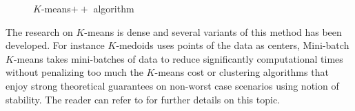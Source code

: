 \begin{figure}[h]
\begin{center}
   \caption{$K$-means$++$ algorithm}
   \label{algo:kmeans++_algo}
\end{center}
\vspace{-15pt}
\end{figure}
The research on $K$-means is dense and several variants of this method has been developed. For instance $K$-medoids \citep{KaufmanR90} uses points of the data as centers, Mini-batch $K$-means\citep{Sculley:2010:WKC:1772690.1772862} takes mini-batches of data to reduce significantly computational times without penalizing too much the $K$-means cost or clustering algorithms that enjoy strong theoretical guarantees on non-worst case scenarios using notion of stability\citep{Ostrovsky2006}. The reader can refer to \citep{hennig2015handbook} for further details on this topic.

